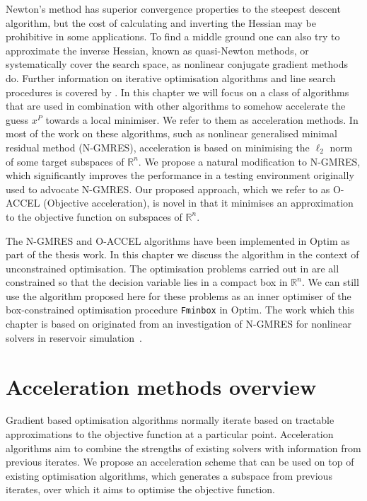 \documentclass[main.tex]{subfiles}
\begin{document}
Newton's method has superior convergence properties to the steepest
descent algorithm, but the cost of calculating and inverting the
Hessian may be prohibitive in some applications.  To find a middle
ground one can also try to approximate the inverse Hessian, known as
quasi-Newton methods, or systematically cover the search space,
as nonlinear conjugate gradient methods do.  Further information on
iterative optimisation algorithms and line search procedures is covered by
\citet{nocedal2006numerical}.  In this chapter we will focus on a
class of algorithms that are used in combination with other algorithms
to somehow accelerate the guess $x^P$ towards a local minimiser.  We
refer to them as acceleration methods.  In most of the work on these
algorithms, such as nonlinear generalised minimal residual method
(N-GMRES), acceleration is based on minimising the $\ell_2$ norm of
some target subspaces of $\mathbb{R}^n$.  We propose a natural
modification to N-GMRES, which significantly improves the performance
in a testing environment originally used to advocate N-GMRES.  Our
proposed approach, which we refer to as O-ACCEL (Objective
acceleration), is novel in that it minimises an approximation to the
objective function on subspaces of $\mathbb{R}^n$.


The N-GMRES and O-ACCEL algorithms have been implemented in
Optim \citep{mogensen2018optim} as part of the thesis work. In this
chapter we discuss the algorithm in the context of unconstrained
optimisation. The optimisation problems carried out in
 are all
constrained so that the decision variable lies in a compact box in
$\mathbb{R}^n$. We can still use the algorithm proposed here for these
problems as an inner optimiser of the box-constrained optimisation
procedure \texttt{Fminbox} in Optim.  The work which this chapter
is based on
originated
from an investigation of N-GMRES for nonlinear solvers in reservoir
simulation~\citep{riseth2015nonlinear}.


\section{Acceleration methods overview}
Gradient based optimisation algorithms normally iterate based on
tractable approximations to the objective function at a particular
point.
Acceleration algorithms aim to combine the strengths of existing
solvers with information from previous iterates.  We propose an
acceleration scheme that can be used on top of existing optimisation
algorithms, which generates a subspace from previous iterates, over
which it aims to optimise the objective function.
\end{document}
